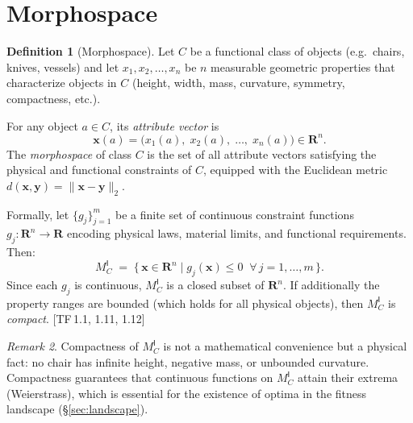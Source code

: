 \documentclass[10pt]{article}
\theoremstyle{definition}
\newtheorem{definition}{Definition}[section]
\theoremstyle{plain}
\theoremstyle{remark}
\newtheorem{remark}[definition]{Remark}
\newcommand{\MC}{M^{\mathsf{I}}_C}          %
\providecommand{\Rn}{}
\renewcommand{\Rn}{\mathbf{R}^n}            %
\providecommand{\R}{}
\renewcommand{\R}{\mathbf{R}}               %
\newcommand{\norm}[1]{\lVert #1 \rVert}
\newcommand{\TF}[1]{\textnormal{[TF\,#1]}}  %
\begin{document}
\section{Morphospace}\label{sec:morphospace}

\begin{definition}[Morphospace]\label{def:1.1}
Let $C$ be a functional class of objects (e.g.\ chairs, knives, vessels)
and let $x_1, x_2, \ldots, x_n$ be $n$ measurable geometric properties
that characterize objects in $C$ (height, width, mass, curvature,
symmetry, compactness, etc.).

For any object $a \in C$, its \emph{attribute vector} is
\[
  \bm{x}(a) = \bigl(x_1(a),\; x_2(a),\; \ldots,\; x_n(a)\bigr)
  \in \Rn.
\]
The \emph{morphospace} of class $C$ is the set of all
attribute vectors satisfying the physical and functional
constraints of $C$, equipped with the Euclidean metric
$d(\bm{x}, \bm{y}) = \norm{\bm{x} - \bm{y}}_2$.

Formally, let $\{g_j\}_{j=1}^{m}$ be a finite set of
continuous constraint functions
$g_j : \Rn \to \R$ encoding physical laws,
material limits, and functional requirements. Then:
\begin{equation}\label{eq:morphospace}
  \MC \;=\; \bigl\{\, \bm{x} \in \Rn
    \;\big|\; g_j(\bm{x}) \leq 0
    \;\;\forall\, j = 1, \ldots, m
  \,\bigr\}.
\end{equation}
Since each $g_j$ is continuous, $\MC$ is a closed subset
of\/ $\Rn$. If additionally the property ranges are bounded
(which holds for all physical objects), then $\MC$ is
\emph{compact}. \TF{1.1, 1.11, 1.12}
\end{definition}

\begin{remark}
Compactness of\/ $\MC$ is not a mathematical convenience but a physical
fact: no chair has infinite height, negative mass, or unbounded curvature.
Compactness guarantees that continuous functions on $\MC$ attain their
extrema (Weierstrass), which is essential for the existence of optima in
the fitness landscape (\S\ref{sec:landscape}).
\end{remark}
\end{document}
